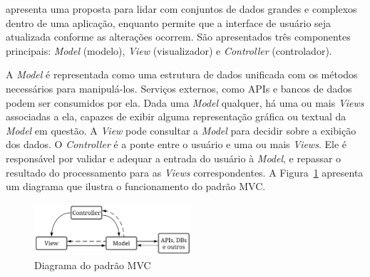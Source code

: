 \cite{mvc-paper} apresenta uma proposta para lidar com conjuntos de dados grandes e complexos dentro de uma aplicação, enquanto permite que a interface de usuário seja atualizada conforme as alterações ocorrem.
São apresentados três componentes principais: \emph{Model} (modelo), \emph{View} (visualizador) e \emph{Controller} (controlador).

A \emph{Model} é representada como uma estrutura de dados unificada com os métodos necessários para manipulá-los.
Serviços externos, como APIs e bancos de dados podem ser consumidos por ela.
Dada uma \emph{Model} qualquer, há uma ou mais \emph{Views} associadas a ela, capazes de exibir alguma representação gráfica ou textual da \emph{Model} em questão.
A \emph{View} pode consultar a \emph{Model} para decidir sobre a exibição dos dados.
O \emph{Controller} é a ponte entre o usuário e uma ou mais \emph{Views}.
Ele é responsável por validar e adequar a entrada do usuário à \emph{Model}, e repassar o resultado do processamento para as \emph{Views} correspondentes.
A Figura~\ref{fig:mvc} apresenta um diagrama que ilustra o funcionamento do padrão MVC.

\begin{figure}[ht]
	\centering
	\includegraphics[width=0.52\textwidth]{images/mvc.png}
	\caption{Diagrama do padrão MVC}
	\label{fig:mvc}
\end{figure}